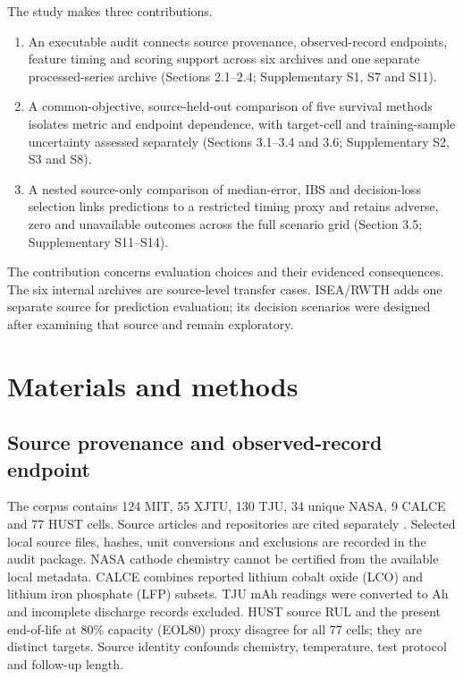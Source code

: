 \documentclass[preprint,12pt]{elsarticle}
\begin{document}
\begin{samepage}
The study makes three contributions.
\begin{enumerate}
\item An executable audit connects source provenance, observed-record endpoints, feature timing and scoring support across six archives and one separate processed-series archive (Sections 2.1--2.4; Supplementary S1, S7 and S11).
\item A common-objective, source-held-out comparison of five survival methods isolates metric and endpoint dependence, with target-cell and training-sample uncertainty assessed separately (Sections 3.1--3.4 and 3.6; Supplementary S2, S3 and S8).
\item A nested source-only comparison of median-error, IBS and decision-loss selection links predictions to a restricted timing proxy and retains adverse, zero and unavailable outcomes across the full scenario grid (Section 3.5; Supplementary S11--S14).
\end{enumerate}
\end{samepage}
The contribution concerns evaluation choices and their evidenced consequences. The six internal archives are source-level transfer cases. ISEA/RWTH adds one separate source for prediction evaluation; its decision scenarios were designed after examining that source and remain exploratory.

\section{Materials and methods}
\subsection{Source provenance and observed-record endpoint}
The corpus contains 124 MIT, 55 XJTU, 130 TJU, 34 unique NASA, 9 CALCE and 77 HUST cells. Source articles and repositories are cited separately \citep{severson2019,wang2024pin,wang2024dataset,zhu2022tju,zhu2022dataset,saha2007,calce2026,calcek2,he2011calce,ma2022hust,ma2022hustdata}. Selected local source files, hashes, unit conversions and exclusions are recorded in the audit package. NASA cathode chemistry cannot be certified from the available local metadata. CALCE combines reported lithium cobalt oxide (LCO) and lithium iron phosphate (LFP) subsets. TJU mAh readings were converted to Ah and incomplete discharge records excluded. HUST source RUL and the present end-of-life at 80\% capacity (EOL80) proxy disagree for all 77 cells; they are distinct targets. Source identity confounds chemistry, temperature, test protocol and follow-up length.
\end{document}
